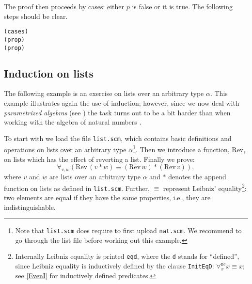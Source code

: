 \documentclass[12pt]{amsart}
\newcommand{\allnc}{\forall^{\mathrm{nc}}} %
\newcommand{\eqd}[2]{#1 \equiv #2}
\newcommand{\inquotes}[1]{``#1''}
\newcommand{\listappend}{\mathbin{\ast}}
\newcommand{\listrev}{\mathrm{Rev}}
\newcommand{\mi}{Minlog}
\begin{document}
The proof then proceeds by cases: either $p$ is false or it is true.
The following steps should be clear.
\begin{verbatim}
(cases)
(prop)
(prop)
\end{verbatim}


\subsection{Induction on lists}
The following example is an exercise on lists over an arbitrary type
$\alpha$.  This example illustrates again the use of induction;
however, since we now deal with \emph{parametrized algebras} (see
\cite{minlogman,SchwichtenbergWainer12}) the task turns out to be a
bit harder than when working with the algebra of natural
numbers%
.

To start with we load the file \texttt{list.scm}, which contains basic
definitions and operations on lists over an arbitrary type
$\alpha$\footnote{ Note that \texttt{list.scm} does require to first
  upload \texttt{nat.scm}.  We recommend to go through the list file
  before working out this example.}.  Then we introduce a function,
$\listrev$, on lists which has the effect of reverting a list. Finally
we prove:
\begin{equation*}
  \forall_{v,w} (\eqd{\listrev\, (v \listappend w)}
  {(\listrev\, w) \listappend (\listrev\, v)}),
\end{equation*}
where $v$ and $w$ are lists over an arbitrary type $\alpha$ and $\ast$
denotes the append function on lists as defined in \texttt{list.scm}.
Further, $\equiv$ represent Leibniz' equality\footnote{Internally
  Leibniz equality is printed \texttt{eqd}, where the \texttt{d}
  stands for \inquotes{defined}, since Leibniz equality is inductively
  defined by the clause \texttt{InitEqD}: $\allnc_x \eqd{x}{x}$; see
\ref{EvenI} for inductively defined predicates.}: two
elements are equal if they have the same properties, i.e., they are
indistinguishable.
\end{document}
